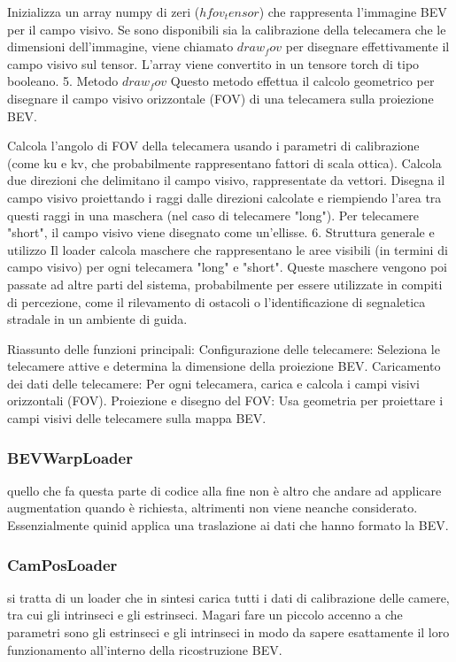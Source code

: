 Inizializza un array numpy di zeri ($hfov_tensor$) che rappresenta l'immagine BEV per il campo visivo.
Se sono disponibili sia la calibrazione della telecamera che le dimensioni dell'immagine, viene chiamato $draw_fov$ per disegnare effettivamente il campo visivo sul tensor.
L'array viene convertito in un tensore torch di tipo booleano.
5. Metodo $draw_fov$
Questo metodo effettua il calcolo geometrico per disegnare il campo visivo orizzontale (FOV) di una telecamera sulla proiezione BEV.

Calcola l'angolo di FOV della telecamera usando i parametri di calibrazione (come ku e kv, che probabilmente rappresentano fattori di scala ottica).
Calcola due direzioni che delimitano il campo visivo, rappresentate da vettori.
Disegna il campo visivo proiettando i raggi dalle direzioni calcolate e riempiendo l'area tra questi raggi in una maschera (nel caso di telecamere "long").
Per telecamere "short", il campo visivo viene disegnato come un'ellisse.
6. Struttura generale e utilizzo
Il loader calcola maschere che rappresentano le aree visibili (in termini di campo visivo) per ogni telecamera "long" e "short". Queste maschere vengono poi passate ad altre parti del sistema, probabilmente per essere utilizzate in compiti di percezione, come il rilevamento di ostacoli o l'identificazione di segnaletica stradale in un ambiente di guida.

Riassunto delle funzioni principali:
Configurazione delle telecamere: Seleziona le telecamere attive e determina la dimensione della proiezione BEV.
Caricamento dei dati delle telecamere: Per ogni telecamera, carica e calcola i campi visivi orizzontali (FOV).
Proiezione e disegno del FOV: Usa geometria per proiettare i campi visivi delle telecamere sulla mappa BEV.

\subsubsection{BEVWarpLoader}


quello che fa questa parte di codice alla fine non è altro che andare ad applicare augmentation quando è richiesta, altrimenti non viene neanche considerato. Essenzialmente quinid applica una traslazione ai dati che hanno formato la BEV. 

\subsubsection{CamPosLoader}
si tratta di un loader che in sintesi carica tutti i dati di calibrazione delle camere, tra cui gli intrinseci e gli estrinseci. 
Magari fare un piccolo accenno a che parametri sono gli estrinseci e gli intrinseci in modo da sapere esattamente il loro funzionamento all'interno della ricostruzione BEV.



